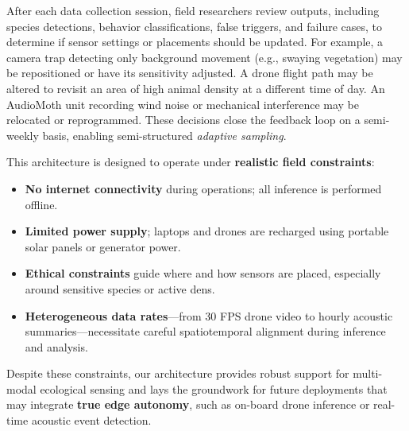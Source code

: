 \documentclass[letterpaper,twocolumn,10pt]{article}
\begin{document}
After each data collection session, field researchers review outputs, including species detections, behavior classifications, false triggers, and failure cases, to determine if sensor settings or placements should be updated. For example, a camera trap detecting only background movement (e.g., swaying vegetation) may be repositioned or have its sensitivity adjusted. A drone flight path may be altered to revisit an area of high animal density at a different time of day. An AudioMoth unit recording wind noise or mechanical interference may be relocated or reprogrammed. These decisions close the feedback loop on a semi-weekly basis, enabling semi-structured \textit{adaptive sampling}.

This architecture is designed to operate under \textbf{realistic field constraints}:
\begin{itemize}
    \item \textbf{No internet connectivity} during operations; all inference is performed offline.
    \item \textbf{Limited power supply}; laptops and drones are recharged using portable solar panels or generator power.
    \item \textbf{Ethical constraints} guide where and how sensors are placed, especially around sensitive species or active dens.
    \item \textbf{Heterogeneous data rates}---from 30 FPS drone video to hourly acoustic summaries---necessitate careful spatiotemporal alignment during inference and analysis.
\end{itemize}

Despite these constraints, our architecture provides robust support for multi-modal ecological sensing and lays the groundwork for future deployments that may integrate \textbf{true edge autonomy}, such as on-board drone inference or real-time acoustic event detection.
\end{document}
